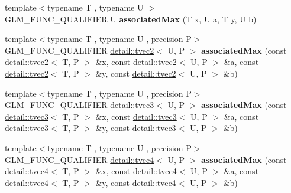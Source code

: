 \begin{DoxyCompactItemize}
\item 
{\footnotesize template$<$typename T , typename U $>$ }\\G\+L\+M\+\_\+\+F\+U\+N\+C\+\_\+\+Q\+U\+A\+L\+I\+F\+I\+ER U {\bfseries associated\+Max} (T x, U a, T y, U b)\hypertarget{namespaceglm_a7700c12d5017a774d6970691147843ba}{}\label{namespaceglm_a7700c12d5017a774d6970691147843ba}

\item 
{\footnotesize template$<$typename T , typename U , precision P$>$ }\\G\+L\+M\+\_\+\+F\+U\+N\+C\+\_\+\+Q\+U\+A\+L\+I\+F\+I\+ER \hyperlink{structglm_1_1detail_1_1tvec2}{detail\+::tvec2}$<$ U, P $>$ {\bfseries associated\+Max} (const \hyperlink{structglm_1_1detail_1_1tvec2}{detail\+::tvec2}$<$ T, P $>$ \&x, const \hyperlink{structglm_1_1detail_1_1tvec2}{detail\+::tvec2}$<$ U, P $>$ \&a, const \hyperlink{structglm_1_1detail_1_1tvec2}{detail\+::tvec2}$<$ T, P $>$ \&y, const \hyperlink{structglm_1_1detail_1_1tvec2}{detail\+::tvec2}$<$ U, P $>$ \&b)\hypertarget{namespaceglm_a0d88182c5f13f53520322787924d21a6}{}\label{namespaceglm_a0d88182c5f13f53520322787924d21a6}

\item 
{\footnotesize template$<$typename T , typename U , precision P$>$ }\\G\+L\+M\+\_\+\+F\+U\+N\+C\+\_\+\+Q\+U\+A\+L\+I\+F\+I\+ER \hyperlink{structglm_1_1detail_1_1tvec3}{detail\+::tvec3}$<$ U, P $>$ {\bfseries associated\+Max} (const \hyperlink{structglm_1_1detail_1_1tvec3}{detail\+::tvec3}$<$ T, P $>$ \&x, const \hyperlink{structglm_1_1detail_1_1tvec3}{detail\+::tvec3}$<$ U, P $>$ \&a, const \hyperlink{structglm_1_1detail_1_1tvec3}{detail\+::tvec3}$<$ T, P $>$ \&y, const \hyperlink{structglm_1_1detail_1_1tvec3}{detail\+::tvec3}$<$ U, P $>$ \&b)\hypertarget{namespaceglm_ad000be1eb1773a86069dbb63ae0d25b7}{}\label{namespaceglm_ad000be1eb1773a86069dbb63ae0d25b7}

\item 
{\footnotesize template$<$typename T , typename U , precision P$>$ }\\G\+L\+M\+\_\+\+F\+U\+N\+C\+\_\+\+Q\+U\+A\+L\+I\+F\+I\+ER \hyperlink{structglm_1_1detail_1_1tvec4}{detail\+::tvec4}$<$ U, P $>$ {\bfseries associated\+Max} (const \hyperlink{structglm_1_1detail_1_1tvec4}{detail\+::tvec4}$<$ T, P $>$ \&x, const \hyperlink{structglm_1_1detail_1_1tvec4}{detail\+::tvec4}$<$ U, P $>$ \&a, const \hyperlink{structglm_1_1detail_1_1tvec4}{detail\+::tvec4}$<$ T, P $>$ \&y, const \hyperlink{structglm_1_1detail_1_1tvec4}{detail\+::tvec4}$<$ U, P $>$ \&b)\hypertarget{namespaceglm_a520ea02280ceecedc01f2857b27d40e4}{}\label{namespaceglm_a520ea02280ceecedc01f2857b27d40e4}


\end{DoxyCompactItemize}
